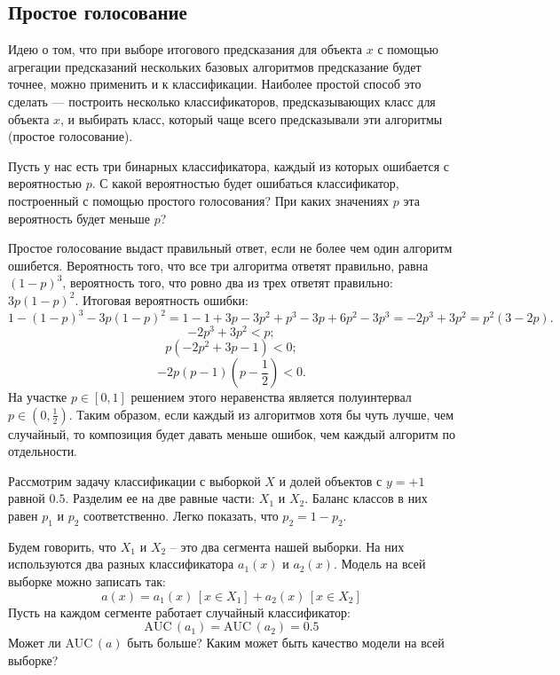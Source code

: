 \documentclass[12pt,fleqn]{article}
\begin{document}
    \subsection{Простое голосование}
    Идею о том, что при выборе итогового предсказания для объекта $x$ с помощью агрегации предсказаний нескольких базовых алгоритмов  предсказание будет точнее, можно применить и к классификации. Наиболее простой способ это сделать --- построить несколько классификаторов, предсказывающих класс для объекта $x$, и выбирать класс, который чаще всего предсказывали эти алгоритмы (простое голосование).
    \begin{vkProblem}
        Пусть у нас есть три бинарных классификатора, каждый из которых ошибается с вероятностью $p$. С какой вероятностью будет ошибаться классификатор, построенный с помощью простого голосования? При каких значениях $p$ эта вероятность будет меньше $p$?
    \end{vkProblem}    
    \begin{esSolution}
        Простое голосование выдаст правильный ответ, если не более чем один алгоритм ошибется. Вероятность того, что все три алгоритма ответят правильно, равна $(1-p)^3$, вероятность того, что ровно два из трех ответят правильно: $3p(1-p)^2$. Итоговая вероятность ошибки:
        \[
        1 - (1-p)^3 - 3p(1-p)^2 = 
        1 - 1 + 3p - 3p^2 + p^3 - 3p + 6 p^2 - 3 p^3 = 
         - 2 p^3+ 3  p^2 = p^2 (3 - 2p).
        \]
        \[
         - 2 p^3+ 3  p^2 < p;
        \]
        \[
        p(- 2 p^2+ 3 p - 1) < 0;
        \]
        \[
        -2 p (p-1) (p - \frac 1 2) < 0.
        \]
        На участке $p \in [0, 1]$ решением этого неравенства является полуинтервал $p \in (0, \frac 1 2)$. Таким образом, если каждый из алгоритмов хотя бы чуть лучше, чем случайный, то композиция будет давать меньше ошибок, чем каждый алгоритм по отдельности.
    \end{esSolution}


    \begin{vkProblem}
        Рассмотрим задачу классификации с выборкой \(X\) и долей объектов с \( y = + 1 \) равной \( 0.5 \).
        Разделим ее на две равные части: \( X_1 \) и \( X_2 \).
        Баланс классов в них равен \( p_1 \) и \( p_2 \) соответственно. Легко показать, что \( p_2 = 1 - p_2 \).
        
        Будем говорить, что \( X_1 \) и \( X_2 \) – это два сегмента нашей выборки. На них используются два
        разных классификатора \( a_1(x) \) и \( a_2(x) \). Модель на всей выборке можно записать так:
        \[
            a(x) = a_1(x)\,[x \in X_1] + a_2(x)\,[x \in X_2]
            \]
        Пусть на каждом сегменте работает случайный классификатор:
        \[
            \text{AUC}\,(a_1) = \text{AUC}\,(a_2) = 0.5
            \]
        Может ли \( \text{AUC}\,(a) \) быть больше? Каким может быть качество модели на всей выборке?
    \end{vkProblem}
    
\end{document}
